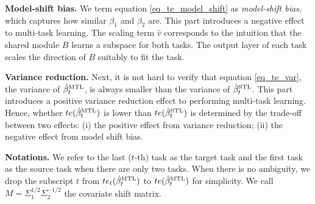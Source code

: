 \textbf{Model-shift bias.}
We term equation \eqref{eq_te_model_shift} as \textit{model-shift bias}, which captures how similar $\beta_1$ and $\beta_2$ are.
This part introduces a negative effect to multi-task learning.
The scaling term $\hat{v}$ corresponds to the intuition that the shared module $B$ learns a subspace for both tasks.
The output layer of each task scales the direction of $B$ suitably to fit the task.

\textbf{Variance reduction.}
Next, it is not hard to verify that equation \eqref{eq_te_var}, the variance of $\hat{\beta}_t^{\text{MTL}}$, is always smaller than the variance of $\hat{\beta}_t^{\text{STL}}$.
This part introduces a positive variance reduction effect to performing multi-task learning.
Hence, whether $te(\hat{\beta}_t^{\text{MTL}})$ is lower than $te(\hat{\beta}_t^{\text{STL}})$ is determined by the trade-off between two effects:
(i) the positive effect from variance reduction;
(ii) the negative effect from model shift bias.


\textbf{Notations.} We refer to the last ($t$-th) task as the target task and the first task as the source task when there are only two tasks.
When there is no ambiguity, we drop the subscript $t$ from $te_t(\hat{\beta}_t^{\text{MTL}})$ to $te(\hat{\beta}_t^{\text{MTL}})$ for simplicity.
We call $M = \Sigma_1^{1/2}\Sigma_2^{-1/2}$ the covariate shift matrix.
